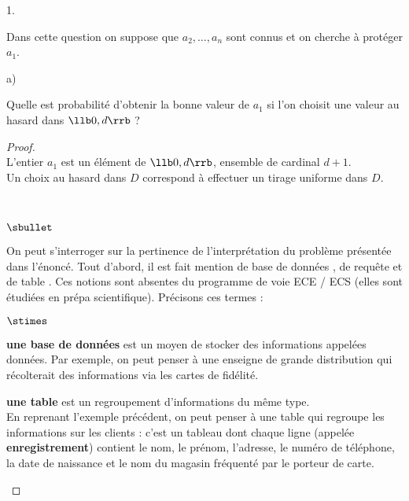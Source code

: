 \documentclass[11pt]{article}%
\begin{document}
\begin{noliste}{1.}
  \setlength{\itemsep}{4mm} %
  \setcounter{enumi}{11}
\item Dans cette question on suppose que $a_2,\ldots,a_n$ sont connus et
  on cherche à protéger $a_1$.
  \begin{noliste}{a)}
  \setlength{\itemsep}{2mm} %
  \item Quelle est probabilité d'obtenir la bonne valeur de $a_1$ si
    l'on choisit une valeur au hasard dans $\llb 0, d \rrb$ ?

    \begin{proof}~\\%
      L'entier $a_1$ est un élément de $\llb 0, d \rrb$, ensemble de
      cardinal $d+1$.\\
      Un choix au hasard dans $D$ correspond à effectuer un tirage
      uniforme dans $D$.%
      \begin{remark}~%
        \begin{noliste}{$\sbullet$}
        \item On peut s'interroger sur la pertinence de
          l'interprétation du problème présentée dans l'énoncé. Tout
          d'abord, il est fait mention de \og base de données \fg{},
          de \og requête \fg{} et de \og table \fg{}. Ces notions sont
          absentes du programme de voie ECE / ECS (elles sont étudiées
          en prépa scientifique). Précisons ces termes :
          \begin{noliste}{$\stimes$}
          \item {\bf une base de données} est un moyen de stocker des
            informations appelées données.
            Par exemple, on peut penser à une enseigne de grande
            distribution qui récolterait des informations via les
            cartes de fidélité.
          \item {\bf une table} est un regroupement d'informations du
            même type.\\
            En reprenant l'exemple précédent, on peut penser à une
            table qui regroupe les informations sur les clients : c'est 
	    un tableau dont chaque ligne (appelée {\bf enregistrement})
            contient le nom, le prénom, l'adresse, le
            numéro de téléphone, la date de naissance et le nom du
            magasin
            fréquenté par le porteur de carte.\\

\end{noliste}
\end{noliste}
\end{remark}
\end{proof}
\end{noliste}
\end{noliste}
\end{document}
